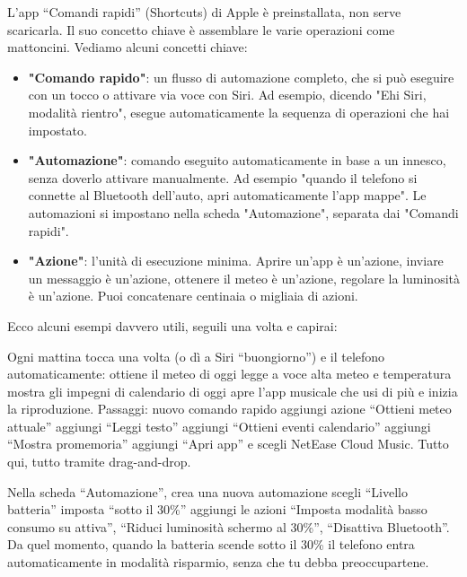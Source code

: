 
L'app “Comandi rapidi” (Shortcuts) di Apple è preinstallata, non serve scaricarla. Il suo concetto chiave è assemblare le varie operazioni come mattoncini. Vediamo alcuni concetti chiave:

\begin{itemize}
  \item \textbf{"Comando rapido"}: un flusso di automazione completo, che si può eseguire con un tocco o attivare via voce con Siri. Ad esempio, dicendo "Ehi Siri, modalità rientro", esegue automaticamente la sequenza di operazioni che hai impostato.
  \item \textbf{"Automazione"}: comando eseguito automaticamente in base a un innesco, senza doverlo attivare manualmente. Ad esempio "quando il telefono si connette al Bluetooth dell'auto, apri automaticamente l'app mappe". Le automazioni si impostano nella scheda "Automazione", separata dai "Comandi rapidi".
  \item \textbf{"Azione"}: l'unità di esecuzione minima. Aprire un'app è un'azione, inviare un messaggio è un'azione, ottenere il meteo è un'azione, regolare la luminosità è un'azione. Puoi concatenare centinaia o migliaia di azioni.
\end{itemize}

Ecco alcuni esempi davvero utili, seguili una volta e capirai:


Ogni mattina tocca una volta (o dì a Siri “buongiorno”) e il telefono automaticamente: ottiene il meteo di oggi legge a voce alta meteo e temperatura mostra gli impegni di calendario di oggi apre l'app musicale che usi di più e inizia la riproduzione. Passaggi: nuovo comando rapido aggiungi azione “Ottieni meteo attuale” aggiungi “Leggi testo” aggiungi “Ottieni eventi calendario” aggiungi “Mostra promemoria” aggiungi “Apri app” e scegli NetEase Cloud Music. Tutto qui, tutto tramite drag-and-drop.


Nella scheda “Automazione”, crea una nuova automazione scegli “Livello batteria” imposta “sotto il 30\%” aggiungi le azioni “Imposta modalità basso consumo su attiva”, “Riduci luminosità schermo al 30\%”, “Disattiva Bluetooth”. Da quel momento, quando la batteria scende sotto il 30\% il telefono entra automaticamente in modalità risparmio, senza che tu debba preoccupartene.

